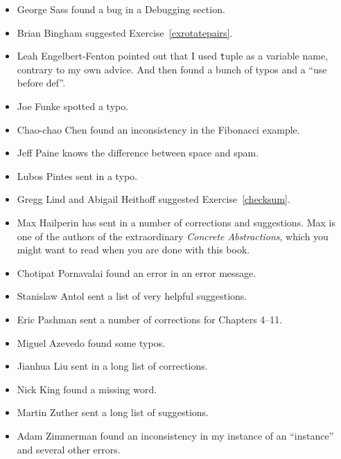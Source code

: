 \documentclass[
DIV=11,
fontsize=13,
twoside,
headinclude=false,
titlepage=firstiscover,
abstract=true,
headsepline=true,
footsepline=true,
chapterprefix=true, %
headings=big,
bibliography=totoc,%
captions=tableheading
]{scrbook}
\theoremstyle{definition}
\begin{document}
\begin{itemize}
\item George Sass found a bug in a Debugging section.

\item Brian Bingham suggested Exercise~\ref{exrotatepairs}.

\item Leah Engelbert-Fenton pointed out that I used {\texttt tuple}
as a variable name, contrary to my own advice.  And then found
a bunch of typos and a ``use before def''.

\item Joe Funke spotted a typo.

\item Chao-chao Chen found an inconsistency in the Fibonacci example.

\item Jeff Paine knows the difference between space and spam.

\item Lubos Pintes sent in a typo.

\item Gregg Lind and Abigail Heithoff suggested Exercise~\ref{checksum}.

\item Max Hailperin has sent in a number of corrections and
  suggestions.  Max is one of the authors of the extraordinary {\em
    Concrete Abstractions}, which you might want to read when you are
  done with this book.

\item Chotipat Pornavalai found an error in an error message.

\item Stanislaw Antol sent a list of very helpful suggestions.

\item Eric Pashman sent a number of corrections for Chapters 4--11.

\item Miguel Azevedo found some typos.

\item Jianhua Liu sent in a long list of corrections.

\item Nick King found a missing word.

\item Martin Zuther sent a long list of suggestions.

\item Adam Zimmerman found an inconsistency in my instance
of an ``instance'' and several other errors.


\end{itemize}
\end{document}
